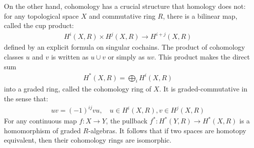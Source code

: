   On the other hand, cohomology has a crucial structure that homology does not: for any topological space $X$ and commutative ring $R$, there is a bilinear map, called the cup product:
  \begin{align*}
  H^i(X, R) \times H^j(X, R) \rightarrow H^{i+j}(X, R)
  \end{align*}
  defined by an explicit formula on singular cochains. The product of cohomology classes $u$ and $v$ is written as $u \cup v$ or simply as $u v$. This product makes the direct sum
  \begin{align*}
  H^*(X, R)=\bigoplus_i H^i(X, R)
  \end{align*}
  into a graded ring, called the cohomology ring of $X$. It is graded-commutative in the sense that:
  \begin{align*}
  u v=(-1)^{i j} v u, \quad u \in H^i(X, R), v \in H^j(X, R)
  \end{align*}
  For any continuous map $f: X \rightarrow Y$, the pullback $f^*: H^*(Y, R) \rightarrow H^*(X, R)$ is a homomorphism of graded $R$-algebras. It follows that if two spaces are homotopy equivalent, then their cohomology rings are isomorphic.
  
